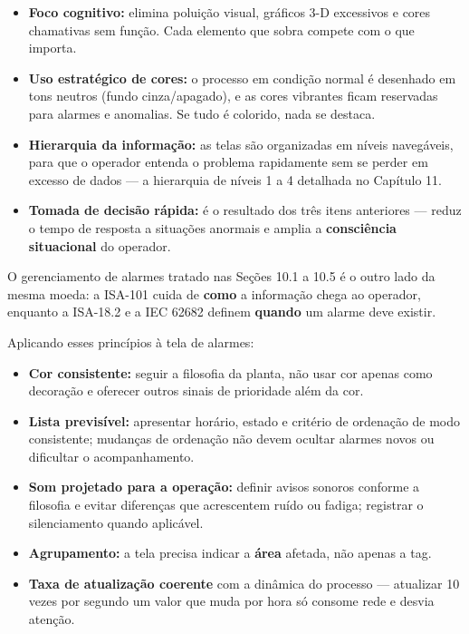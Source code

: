 \begin{itemize}
\tightlist
\item
  \textbf{Foco cognitivo:} elimina poluição visual, gráficos 3-D excessivos e cores chamativas sem função. Cada elemento que sobra compete com o que importa.
\item
  \textbf{Uso estratégico de cores:} o processo em condição normal é desenhado em tons neutros (fundo cinza/apagado), e as cores vibrantes ficam reservadas para alarmes e anomalias. Se tudo é colorido, nada se destaca.
\item
  \textbf{Hierarquia da informação:} as telas são organizadas em níveis navegáveis, para que o operador entenda o problema rapidamente sem se perder em excesso de dados --- a hierarquia de níveis 1 a 4 detalhada no Capítulo 11.
\item
  \textbf{Tomada de decisão rápida:} é o resultado dos três itens anteriores --- reduz o tempo de resposta a situações anormais e amplia a \textbf{consciência situacional} do operador.
\end{itemize}

O gerenciamento de alarmes tratado nas Seções 10.1 a 10.5 é o outro lado da mesma moeda: a ISA-101 cuida de \textbf{como} a informação chega ao operador, enquanto a ISA-18.2 e a IEC 62682 definem \textbf{quando} um alarme deve existir.

Aplicando esses princípios à tela de alarmes:

\begin{itemize}
\tightlist
\item
  \textbf{Cor consistente:} seguir a filosofia da planta, não usar cor apenas como decoração e oferecer outros sinais de prioridade além da cor.
\item
  \textbf{Lista previsível:} apresentar horário, estado e critério de ordenação de modo consistente; mudanças de ordenação não devem ocultar alarmes novos ou dificultar o acompanhamento.
\item
  \textbf{Som projetado para a operação:} definir avisos sonoros conforme a filosofia e evitar diferenças que acrescentem ruído ou fadiga; registrar o silenciamento quando aplicável.
\item
  \textbf{Agrupamento:} a tela precisa indicar a \textbf{área} afetada, não apenas a tag.
\item
  \textbf{Taxa de atualização coerente} com a dinâmica do processo --- atualizar 10 vezes por segundo um valor que muda por hora só consome rede e desvia atenção.
\end{itemize}

